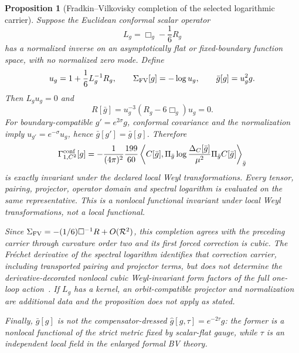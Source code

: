 \documentclass[11pt]{article}
\newtheorem{proposition}[theorem]{Proposition}
\theoremstyle{definition}
\theoremstyle{remark}
\begin{document}
\begin{proposition}[Fradkin--Vilkovisky completion of the selected logarithmic carrier]
Suppose the Euclidean conformal scalar operator
\[
 L_g=\Box_g-\frac16R_g
\]
has a normalized inverse on an asymptotically flat or fixed-boundary function
space, with no normalized zero mode.  Define
\[
 u_g=1+\frac16L_g^{-1}R_g,\qquad
 \Sigma_{\rm FV}[g]=-\log u_g,\qquad
 \bar g[g]=u_g^2g.
\]
Then $L_gu_g=0$ and
\[
 R[\bar g]=u_g^{-3}(R_g-6\Box_g)u_g=0.
\]
For boundary-compatible $g'=e^{2\sigma}g$, conformal covariance and the
normalization imply $u_{g'}=e^{-\sigma}u_g$, hence
$\bar g[g']=\bar g[g]$.  Therefore
\[
 \Gamma^{\rm conf}_{1,C^2}[g]
 =-\frac1{(4\pi)^2}\frac{199}{60}
 \left\langle C[\bar g],\Pi_{\bar g}
 \log\frac{\Delta_C[\bar g]}{\mu^2}
 \Pi_{\bar g}C[\bar g]\right\rangle_{\bar g}
\]
is exactly invariant under the declared local Weyl transformations.  Every
tensor, pairing, projector, operator domain and spectral logarithm is evaluated
on the same representative.  This is a nonlocal functional invariant under
local Weyl transformations, not a local functional.

Since $\Sigma_{\rm FV}=-(1/6)\Box^{-1}R+O(\mathcal R^2)$, this completion
agrees with the preceding carrier through curvature order two and its first
forced correction is cubic.  The Fr\'echet derivative of the spectral
logarithm identifies that correction carrier, including transported pairing
and projector terms, but does not determine the derivative-decorated nonlocal
cubic Weyl-invariant form factors of the full one-loop action~\cite{BarvinskyWachowski}.
If $L_g$ has a kernel, an orbit-compatible projector and normalization are
additional data and the proposition does not apply as stated.

Finally, $\bar g[g]$ is not the compensator-dressed
$\widehat g[g,\tau]=e^{-2\tau}g$: the former is a nonlocal functional of the
strict metric fixed by scalar-flat gauge, while $\tau$ is an independent local
field in the enlarged formal BV theory.
\end{proposition}
\end{document}
